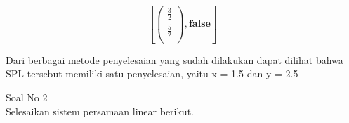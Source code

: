 \begin{eulernotebook}
\begin{eulercomment}
\begin{eulercomment}
\begin{eulercomment}
\begin{eulercomment}
\begin{eulerformula}
\[\]
\end{eulerformula}
\begin{eulerformula}
\[
\left[ \begin{pmatrix}\frac{3}{2} \\ \frac{5}{2} \\ \end{pmatrix}
  , \mathbf{false} \right] 
\]
\end{eulerformula}
\begin{eulercomment}
Dari berbagai metode penyelesaian yang sudah dilakukan dapat dilihat
bahwa SPL tersebut memiliki satu penyelesaian, yaitu x = 1.5 dan y =
2.5

\end{eulercomment}
\eulersubheading{}
\begin{eulercomment}
Soal No 2\\
Selesaikan sistem persamaan linear berikut.


\end{eulercomment}
\end{eulercomment}
\end{eulercomment}
\end{eulercomment}
\end{eulercomment}
\end{eulernotebook}

